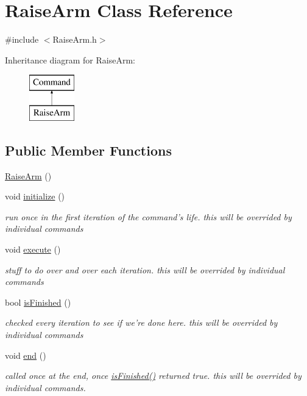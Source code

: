 \hypertarget{classRaiseArm}{\section{Raise\-Arm Class Reference}
\label{classRaiseArm}
}


{\ttfamily \#include $<$Raise\-Arm.\-h$>$}

Inheritance diagram for Raise\-Arm\-:\begin{figure}[H]
\begin{center}
\leavevmode
\includegraphics[height=2.000000cm]{classRaiseArm}
\end{center}
\end{figure}
\subsection*{Public Member Functions}
\begin{DoxyCompactItemize}
\item 
\hyperlink{classRaiseArm_a91b62d0ce0bae3391a2fdb617b603f8b}{Raise\-Arm} ()
\item 
void \hyperlink{classRaiseArm_a643abff446802bf06eb0141d3cad5ef4}{initialize} ()
\begin{DoxyCompactList}\small\item\em run once in the first iteration of the command's life. this will be overrided by individual commands \end{DoxyCompactList}\item 
void \hyperlink{classRaiseArm_a4e73ea27587532325bfea84e2fe72f62}{execute} ()
\begin{DoxyCompactList}\small\item\em stuff to do over and over each iteration. this will be overrided by individual commands \end{DoxyCompactList}\item 
bool \hyperlink{classRaiseArm_a3f2f2806c7b255589864feae9322bbd1}{is\-Finished} ()
\begin{DoxyCompactList}\small\item\em checked every iteration to see if we're done here. this will be overrided by individual commands \end{DoxyCompactList}\item 
void \hyperlink{classRaiseArm_a61c556ef1ca7e8c92970cec3baef933e}{end} ()
\begin{DoxyCompactList}\small\item\em called once at the end, once \hyperlink{classRaiseArm_a3f2f2806c7b255589864feae9322bbd1}{is\-Finished()} returned true. this will be overrided by individual commands. \end{DoxyCompactList}\end{DoxyCompactItemize}
